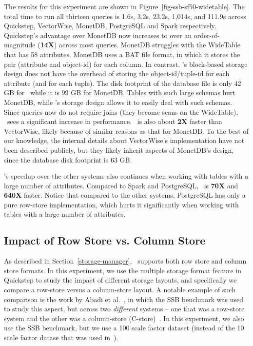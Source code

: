 The results for this experiment are shown in Figure~\ref{fig-ssb-sf50-widetable}. The total time to run all thirteen queries is 1.6s, 3.2s, 	23.2s, 1,014s, and	111.9s across Quickstep, VectorWise, MonetDB, PostgreSQL and Spark respectively. Quickstep's  advantage over MonetDB now increases to over an order-of-magnitude (\textbf{14X}) across most queries.
MonetDB struggles with the WideTable that has 58 attributes. MonetDB uses a BAT file format, in which it stores the pair (attribute and object-id) for each column. In contrast, \Quickstep's block-based storage design does not have the overhead of storing the object-id/tuple-id for each attribute (and for each tuple). The disk footprint of the database file is only 42 GB for \Quickstep\ while it is 99 GB for MonetDB. Tables with such large schemas hurt MonetDB, while \Quickstep's storage design allows it to easily deal with such schemas. Since queries now do not require joins (they become scans on the WideTable), \Quickstep\ sees a significant increase in performance.
\Quickstep\ is also about \textbf{2X} faster than VectorWise, likely because of similar reasons as that for MonetDB. To the best of our knowledge, the internal details about VectorWise's implementation have not been described publicly, but they likely inherit aspects of MonetDB's design, since the database disk footprint is 63 GB.

\Quickstep's speedup over the other systems also continues when working with tables with a large number of attributes. Compared to Spark and PostgreSQL, \Quickstep\ is \textbf{70X} and \textbf{640X} faster. Notice that compared to the other systems, PostgreSQL has only a pure row-store implementation, which hurts it significantly when working with tables with a large number of attributes.

\subsection{Impact of Row Store vs. Column Store}
\label{sec:expt:rs-vs-cs}

As described in Section~\ref{storage-manager}, \Quickstep\ supports both row store and column store formats. %
In this experiment, we use the multiple storage format feature in Quickstep to study the impact of different storage layouts, and specifically we compare a row-store versus a column-store layout. A notable example of such comparison is the work by Abadi et al.~\cite{AbadiMH08}, in which the SSB benchmark was used to study this aspect, but across two \textit{different} systems -- one that was a row-store system and the other was a column-store (C-store)~\cite{StonebrakerABCCFLLMOORTZ05}.  In this experiment, we also use the SSB benchmark, but we use a 100 scale factor dataset (instead of the 10 scale factor datase that was used in~\cite{AbadiMH08}).

